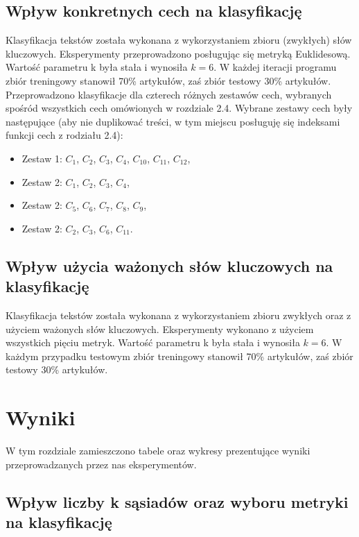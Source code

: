 \documentclass{classrep}
\begin{document}
\subsection{Wpływ konkretnych cech na klasyfikację}
Klasyfikacja tekstów została wykonana z wykorzystaniem zbioru (zwykłych) słów kluczowych. Eksperymenty przeprowadzono posługując się metryką Euklidesową. Wartość parametru k była stała i wynosiła $k=6$. W każdej iteracji programu zbiór treningowy stanowił 70\% artykułów, zaś zbiór testowy 30\% artykułów. Przeprowadzono klasyfikacje dla czterech różnych zestawów cech, wybranych spośród wszystkich cech omówionych w rozdziale 2.4. Wybrane zestawy cech były następujące (aby nie duplikować treści, w tym miejscu posługuję się indeksami funkcji cech z rodziału 2.4):
\begin{itemize}[label=$\bullet$\scshape\bfseries]

\item Zestaw 1: $C_{1}$,  $C_{2}$,  $C_{3}$,  $C_{4}$,  $C_{10}$,  $C_{11}$,  $C_{12}$,
\item Zestaw 2: $C_{1}$,  $C_{2}$,  $C_{3}$,  $C_{4}$,
\item Zestaw 2: $C_{5}$,  $C_{6}$,  $C_{7}$,  $C_{8}$,  $C_{9}$,
\item Zestaw 2: $C_{2}$,  $C_{3}$,  $C_{6}$,  $C_{11}$.
\end{itemize}

\subsection{Wpływ użycia ważonych słów kluczowych na klasyfikację}
Klasyfikacja tekstów została wykonana z wykorzystaniem zbioru zwykłych oraz z użyciem ważonych słów kluczowych. Eksperymenty wykonano z użyciem wszystkich pięciu metryk. Wartość parametru k była stała i wynosiła $k=6$. W każdym przypadku testowym zbiór treningowy stanowił 70\% artykułów, zaś zbiór testowy 30\% artykułów.

\section{Wyniki}
W tym rozdziale zamieszczono tabele oraz wykresy prezentujące wyniki przeprowadzanych przez nas eksperymentów.

\subsection{Wpływ liczby k sąsiadów oraz wyboru metryki na klasyfikację}
\end{document}
